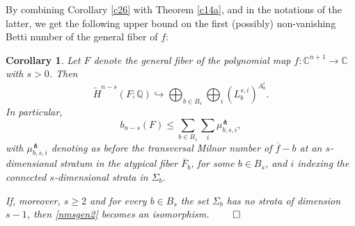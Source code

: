 \documentclass[12pt,leqno,twoside]{amsart}
\newtheorem{corollary}[theorem]{Corollary}
\theoremstyle{remark}
\theoremstyle{remark}
\theoremstyle{definition}
\theoremstyle{remark}
\theoremstyle{remark}
\theoremstyle{remark}
\numberwithin{equation}{section}  %
\def\be{\begin{equation}}
\def\ee{\end{equation}}
\def\bc{\begin{corollary}}
\def\ec{\end{corollary}}
\newcommand{\bC}{\mathbb{C}}
\newcommand{\bQ}{\mathbb{Q}}
\newcommand{\of}{\overline{f}}
\newcommand{\oF}{\overline{F}}
\begin{document}
By combining Corollary \ref{c26} with Theorem \ref{c14a}, and in the notations of the latter, we get the following upper bound on the first (possibly) non-vanishing Betti number of the general fiber of $f$:
\bc\label{nmsb}
Let $F$ denote the general fiber of the polynomial map $f\colon\bC^{n+1}\to \bC$ with $s>0$. Then 
\be\label{nmsgen2}
\widetilde{H}^{n-s}(F;\bQ)\hookrightarrow \bigoplus_{b \in B_s}  \bigoplus_i \left({L}_b^{s,i}\right)^{A_b^i}.
\ee
In particular, 
 \be\label{nmsgb}
b_{n-s}(F) \leq  \sum_{b \in B_s} \sum_i  \mu^\pitchfork_{b,s,i},
 \ee
with $\mu^\pitchfork_{b,s,i}$ denoting as before the transversal Milnor  number of $\of-b$ at an $s$-dimensional stratum in the atypical fiber $\oF_b$, for some $b \in B_s$, and $i$ indexing the connected $s$-dimensional strata in $\Sigma_b$.

 If, moreover, $s\geq 2$ and for every $b \in B_s$ the set $\Sigma_b$ has no strata of dimension $s-1$, then \eqref{nmsgen2} becomes an isomorphism. $\hfill\qed$
\ec
\end{document}
